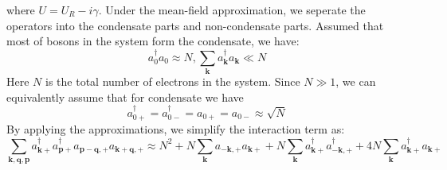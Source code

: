 \documentclass{article}
\newcommand{\tmmathbf}[1]{\ensuremath{\boldsymbol{#1}}}
\begin{document}
where $U = U_R - i \gamma$. Under the mean-field approximation, we seperate
the operators into the condensate parts and non-condensate parts. Assumed that
most of bosons in the system form the condensate, we have:
\begin{equation}
  a_0^{\dagger} a_0 \approx N, \sum_{\tmmathbf{k}} a_{\tmmathbf{k}}^{\dagger}
  a_{\tmmathbf{k}} \ll N
\end{equation}
Here $N$ is the total number of electrons in the system. Since $N \gg 1$, we
can equivalently assume that for condensate we have
\begin{equation}
  a_{0 +}^{\dagger} = a_{0 -}^{\dagger} = a_{0 +} = a_{0 -} \approx \sqrt{N}
\end{equation}
By applying the approximations, we simplify the interaction term as:
\begin{equation}
  \sum_{\tmmathbf{k}, \tmmathbf{q}, \tmmathbf{p}} a_{\tmmathbf{k}+}^{\dagger}
  a_{\tmmathbf{p}+}^{\dagger} a_{\tmmathbf{p}-\tmmathbf{q}, +}
  a_{\tmmathbf{k}+\tmmathbf{q}, +} \approx N^2 + N \sum_{\tmmathbf{k}}
  a_{-\tmmathbf{k}, +} a_{\tmmathbf{k}+} + N \sum_{\tmmathbf{k}}
  a_{\tmmathbf{k}+}^{\dagger} a_{-\tmmathbf{k}, +}^{\dagger} + 4 N
  \sum_{\tmmathbf{k}} a_{\tmmathbf{k}+}^{\dagger} a_{\tmmathbf{k}+}
  \label{mean1}
\end{equation}
\end{document}
